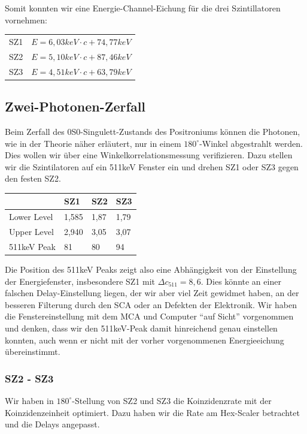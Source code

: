 Somit konnten wir eine Energie-Channel-Eichung für die drei Szintillatoren vornehmen:
\begin{tabular}{ll}
 SZ1 & $E = 6,03 keV \cdot c + 74,77 keV$\\
 SZ2 & $E = 5,10 keV \cdot c + 87,46 keV$\\
 SZ3 & $E = 4,51 keV \cdot c + 63,79 keV$ 
\end{tabular}


\subsection{Zwei-Photonen-Zerfall}

Beim Zerfall des 0S0-Singulett-Zustands des Positroniums können die Photonen, wie in der Theorie näher erläutert, nur in einem $180^\circ$-Winkel abgestrahlt werden. Dies wollen wir über eine Winkelkorrelationsmessung verifizieren. Dazu stellen wir die Szintilatoren auf ein 511keV Fenster ein und drehen SZ1 oder SZ3 gegen den festen SZ2. 

\begin{center}
\begin{tabular}{llll}
\toprule
 & SZ1 & SZ2 & SZ3\\
\midrule
Lower Level & 1,585 & 1,87 & 1,79\\
Upper Level & 2,940 & 3,05 & 3,07\\
511keV Peak & 81  & 80 & 94\\
\bottomrule
\end{tabular}
\end{center}

Die Position des 511keV Peaks zeigt also eine Abhängigkeit von der Einstellung der Energiefenster, insbesondere SZ1 mit $\Delta c_{511} = 8,6$. Dies könnte an einer falschen Delay-Einstellung liegen, der wir aber viel Zeit gewidmet haben, an der besseren Filterung durch den SCA oder an Defekten der Elektronik. Wir haben die Fenstereinstellung mit dem MCA und Computer "`auf Sicht"' vorgenommen und denken, dass wir den 511keV-Peak damit hinreichend genau einstellen konnten, auch wenn er nicht mit der vorher vorgenommenen Energieeichung übereinstimmt.

\subsubsection{SZ2 - SZ3}

Wir haben in $180^\circ$-Stellung von SZ2 und SZ3 die Koinzidenzrate mit der Koinzidenzeinheit optimiert. Dazu haben wir die Rate am Hex-Scaler betrachtet und die Delays angepasst.

